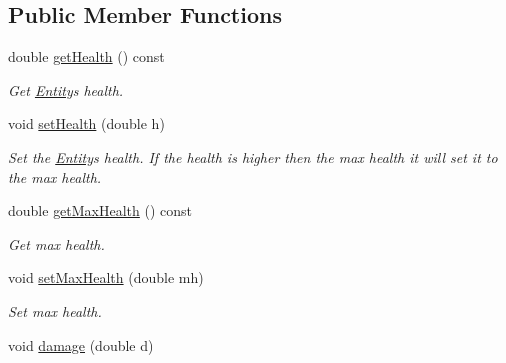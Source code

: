 \subsection*{Public Member Functions}
\begin{DoxyCompactItemize}
\item 
double \hyperlink{classEntity_a19c16788d1361e72ac26abb48c7d760f}{get\+Health} () const \hypertarget{classEntity_a19c16788d1361e72ac26abb48c7d760f}{}\label{classEntity_a19c16788d1361e72ac26abb48c7d760f}

\begin{DoxyCompactList}\small\item\em Get \hyperlink{classEntity}{Entity}\textquotesingle{}s health. \end{DoxyCompactList}\item 
void \hyperlink{classEntity_a4f521d321ea874c474cc0506ff78da08}{set\+Health} (double h)\hypertarget{classEntity_a4f521d321ea874c474cc0506ff78da08}{}\label{classEntity_a4f521d321ea874c474cc0506ff78da08}

\begin{DoxyCompactList}\small\item\em Set the \hyperlink{classEntity}{Entity}\textquotesingle{}s health. If the health is higher then the max health it will set it to the max health. \end{DoxyCompactList}\item 
double \hyperlink{classEntity_a5db2ad1ad9e13953207fec9786e632ca}{get\+Max\+Health} () const \hypertarget{classEntity_a5db2ad1ad9e13953207fec9786e632ca}{}\label{classEntity_a5db2ad1ad9e13953207fec9786e632ca}

\begin{DoxyCompactList}\small\item\em Get max health. \end{DoxyCompactList}\item 
void \hyperlink{classEntity_a375385b808ac7fd4632d6b71f15b0e1c}{set\+Max\+Health} (double mh)\hypertarget{classEntity_a375385b808ac7fd4632d6b71f15b0e1c}{}\label{classEntity_a375385b808ac7fd4632d6b71f15b0e1c}

\begin{DoxyCompactList}\small\item\em Set max health. \end{DoxyCompactList}\item 
void \hyperlink{classEntity_af7fb432e778f9fcfe4584d09b6a73294}{damage} (double d)\hypertarget{classEntity_af7fb432e778f9fcfe4584d09b6a73294}{}\label{classEntity_af7fb432e778f9fcfe4584d09b6a73294}


\end{DoxyCompactItemize}
